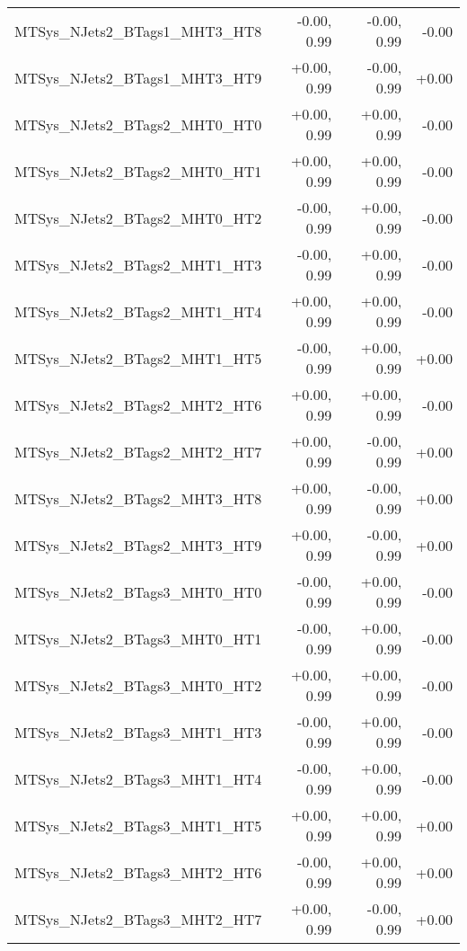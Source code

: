 \begin{tabular}{|l|r|r|r|}
MTSys\_NJets2\_BTags1\_MHT3\_HT8         &      -0.00, 0.99 &     -0.00, 0.99 &  -0.00 \\
MTSys\_NJets2\_BTags1\_MHT3\_HT9         &      +0.00, 0.99 &     -0.00, 0.99 &  +0.00 \\
MTSys\_NJets2\_BTags2\_MHT0\_HT0         &      +0.00, 0.99 &     +0.00, 0.99 &  -0.00 \\
MTSys\_NJets2\_BTags2\_MHT0\_HT1         &      +0.00, 0.99 &     +0.00, 0.99 &  -0.00 \\
MTSys\_NJets2\_BTags2\_MHT0\_HT2         &      -0.00, 0.99 &     +0.00, 0.99 &  -0.00 \\
MTSys\_NJets2\_BTags2\_MHT1\_HT3         &      -0.00, 0.99 &     +0.00, 0.99 &  -0.00 \\
MTSys\_NJets2\_BTags2\_MHT1\_HT4         &      +0.00, 0.99 &     +0.00, 0.99 &  -0.00 \\
MTSys\_NJets2\_BTags2\_MHT1\_HT5         &      -0.00, 0.99 &     +0.00, 0.99 &  +0.00 \\
MTSys\_NJets2\_BTags2\_MHT2\_HT6         &      +0.00, 0.99 &     +0.00, 0.99 &  -0.00 \\
MTSys\_NJets2\_BTags2\_MHT2\_HT7         &      +0.00, 0.99 &     -0.00, 0.99 &  +0.00 \\
MTSys\_NJets2\_BTags2\_MHT3\_HT8         &      +0.00, 0.99 &     -0.00, 0.99 &  +0.00 \\
MTSys\_NJets2\_BTags2\_MHT3\_HT9         &      +0.00, 0.99 &     -0.00, 0.99 &  +0.00 \\
MTSys\_NJets2\_BTags3\_MHT0\_HT0         &      -0.00, 0.99 &     +0.00, 0.99 &  -0.00 \\
MTSys\_NJets2\_BTags3\_MHT0\_HT1         &      -0.00, 0.99 &     +0.00, 0.99 &  -0.00 \\
MTSys\_NJets2\_BTags3\_MHT0\_HT2         &      +0.00, 0.99 &     +0.00, 0.99 &  -0.00 \\
MTSys\_NJets2\_BTags3\_MHT1\_HT3         &      -0.00, 0.99 &     +0.00, 0.99 &  -0.00 \\
MTSys\_NJets2\_BTags3\_MHT1\_HT4         &      -0.00, 0.99 &     +0.00, 0.99 &  -0.00 \\
MTSys\_NJets2\_BTags3\_MHT1\_HT5         &      +0.00, 0.99 &     +0.00, 0.99 &  +0.00 \\
MTSys\_NJets2\_BTags3\_MHT2\_HT6         &      -0.00, 0.99 &     +0.00, 0.99 &  +0.00 \\
MTSys\_NJets2\_BTags3\_MHT2\_HT7         &      +0.00, 0.99 &     -0.00, 0.99 &  +0.00 \\

\end{tabular}
